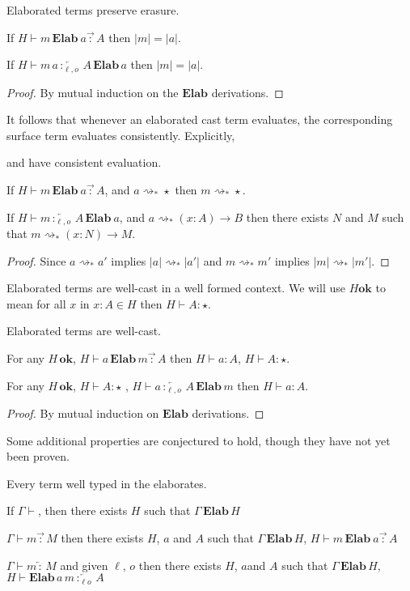 \begin{thm} Elaborated terms preserve erasure.
 
If $H\vdash m\,\textbf{Elab}\ a\overrightarrow{\,:\,}A$ then $|m|=|a|$.
 
If $H\vdash m\,a\overleftarrow{\,:_{\ell,o}\,}A\,\textbf{Elab}\,a$ then $|m|=|a|$.
\end{thm}
\begin{proof}
By mutual induction on the $\textbf{Elab}$ derivations.
\end{proof}

It follows that whenever an elaborated cast term evaluates, the corresponding surface term evaluates consistently.
Explicitly,
\begin{thm} \Slang{} and \clang{} have consistent evaluation.
 
If $H\vdash m\,\textbf{Elab}\ a\overrightarrow{\,:\,}A$, and $a\rightsquigarrow_{*}\star$ then $m\rightsquigarrow_{*}\star$.
 
If $H\vdash m\overleftarrow{\,:_{\ell,o}\,}A\,\textbf{Elab}\ a$, and $a\rightsquigarrow_{*}(x:A)\rightarrow B$ then there exists $N$ and $M$ such that $m\rightsquigarrow_{*}(x:N)\rightarrow M$.
\end{thm}

\begin{proof}
Since $a\rightsquigarrow_{*}a'$ implies $|a|\rightsquigarrow_{*}|a'|$ and $m\rightsquigarrow_{*}m'$ implies $|m|\rightsquigarrow_{*}|m'|$.
\end{proof}

Elaborated terms are well-cast in a well formed context.
We will use $H \textbf{ok}$ to mean for all $x$ in $x : A \in H$ then $H \vdash A : \star$.

\begin{thm} Elaborated terms are well-cast.
 
For any $H\,\textbf{ok}$, $H\vdash a\,\textbf{Elab}\,m\overrightarrow{\,:\,}A$ then $H\vdash a:A$, $H\vdash A:\star$.
 
For any $H\,\textbf{ok}$, $H\vdash A:\star$ , $H\vdash a\overleftarrow{\,:_{\ell,o}\,}A\,\textbf{Elab}\,m$ then $H\vdash a:A$.
\end{thm}
\begin{proof}
By mutual induction on $\textbf{Elab}$ derivations.
\end{proof}

Some additional properties are conjectured to hold, though they have not yet been proven.

\begin{conjecture}
Every term well typed in the \bidir{} \slang{} elaborates.
 
If $\Gamma\vdash$, then there exists $H$ such that $\Gamma\,\textbf{Elab}\,H$
 
$\Gamma\vdash m\overrightarrow{\,:\,}M$ then there exists $H$, $a$ and $A$ such that $\Gamma\,\textbf{Elab}\,H$, $H\vdash m\,\textbf{Elab}\ a\overrightarrow{\,:\,}A$
 
$\Gamma\vdash m\overleftarrow{\,:\,}M$ and given $\ell$, $o$ then there exists $H$, $a$and $A$ such that $\Gamma\,\textbf{Elab}\,H$, $H\vdash\textbf{Elab}\,a\,m\overleftarrow{\,:_{\ell o}\,}A$
\end{conjecture}
 
